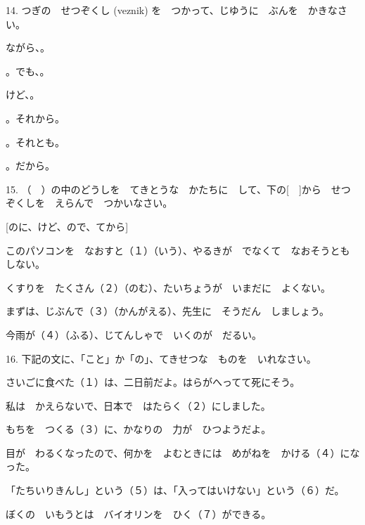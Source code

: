 	\begin{mondai}{14. つぎの　せつぞくし (veznik) を　つかって、じゆうに　ぶんを　かきなさい。}
		\item \makebox[180pt]{\hrulefill}ながら、\makebox[180pt]{\hrulefill}。
		\vspace{5pt}
		\item \makebox[180pt]{\hrulefill}。でも、\makebox[180pt]{\hrulefill}。
		\vspace{5pt}
		\item \makebox[180pt]{\hrulefill}けど、\makebox[180pt]{\hrulefill}。
		\vspace{5pt}
		\item \makebox[180pt]{\hrulefill}。それから\makebox[180pt]{\hrulefill}。
		\vspace{5pt}
		\item \makebox[180pt]{\hrulefill}。それとも\makebox[180pt]{\hrulefill}。
		\vspace{5pt}
		\item \makebox[180pt]{\hrulefill}。だから\makebox[180pt]{\hrulefill}。
	\end{mondai}

	\begin{mondai}{15. （　）の中のどうしを　てきとうな　かたちに　して、下の[　]から　せつぞくしを　えらんで　つかいなさい。
			
		[のに、けど、ので、てから]}
		\item このパソコンを　なおすと（１）（いう）、やるきが　でなくて　なおそうとも　しない。
		\item くすりを　たくさん（２）（のむ）、たいちょうが　いまだに　よくない。
		\item まずは、じぶんで（３）（かんがえる）、先生に　そうだん　しましょう。
		\item 今雨が（４）（ふる）、じてんしゃで　いくのが　だるい。
	\end{mondai}

	\begin{mondai}{16. 下記の文に、「こと」か「の」、てきせつな　ものを　いれなさい。}
		\item さいごに食べた（１）は、二日前だよ。はらがへってて死にそう。
		\item 私は　かえらないで、日本で　はたらく（２）にしました。
		\item もちを　つくる（３）に、かなりの　力が　ひつようだよ。
		\item 目が　わるくなったので、何かを　よむときには　めがねを　かける（４）になった。
		\item 「たちいりきんし」という（５）は、「入ってはいけない」という（６）だ。
		\item ぼくの　いもうとは　バイオリンを　ひく（７）ができる。
	\end{mondai}

